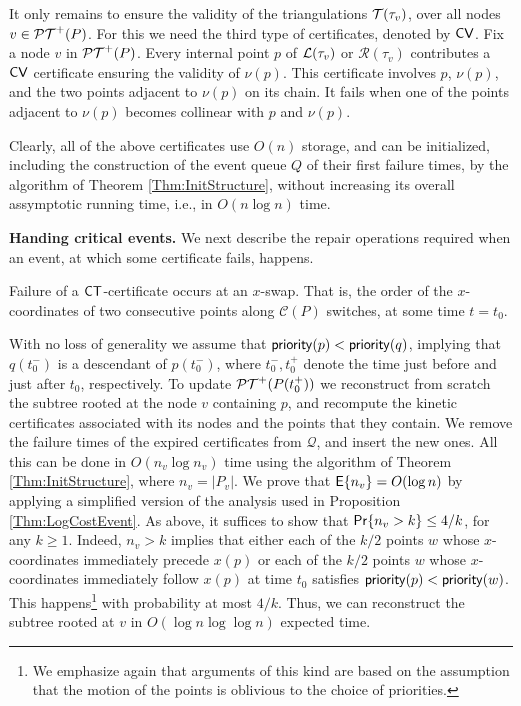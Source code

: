 \documentclass[11pt]{article}
\def \Exp{{\sf E}}
\def\PT{{\cal PT}}
\def\CT{{\sf CT}}
\def\CV{{\sf CV}}
\def\T{{\cal T}}
\def\prior{{\sf priority}}
\def\C{\mathcal{C}}
\def\Q{\mathcal{Q}}
\def\L{{\cal L}}
\def\R{\mathcal{R}}
\def\prob{{\sf Pr}}
\begin{document}
\smallskip
\noindent {\bf \emph{$\CV$-certificates}.}
It only remains to ensure the validity of the triangulations $\T(\tau_v)$, over all nodes
$v\in \PT^+(P)$. For this we need the third type of certificates, denoted by
$\CV$.  Fix a node $v$ in $\PT^+(P)$. Every internal point $p$ of
$\L(\tau_v)$ or $\R(\tau_v)$ contributes a $\CV$ certificate ensuring
the validity of $\nu(p)$. This certificate involves $p$, $\nu(p)$, and 
the two points adjacent to 
 $\nu(p)$ on its chain. It fails when one
of the points adjacent to
$\nu(p)$  becomes collinear with $p$ and $\nu(p)$.

Clearly, all of the above certificates use $O(n)$ storage,
and can be initialized, including the construction of the event queue $Q$ of their first failure times, by the algorithm of Theorem
\ref{Thm:InitStructure}, without increasing its overall assymptotic
running time, i.e., in $O(n\log n)$ time.

\medskip
\noindent
{\bf Handing critical events.} 
We next describe the repair operations 
required when an event, at which some certificate fails, happens. 

\smallskip
\noindent{\bf \emph{$\CT$-certificates.}} Failure of a $\CT$-certificate occurs at an $x$-swap.
That is,
the order of the $x$-coordinates of two consecutive points along $\C(P)$ switches, at some time $t=t_0$.

With no loss of generality we assume that $\prior(p)<\prior(q)$,
implying that $q(t_0^-)$ is a descendant of $p(t_0^-)$, where $t_0^-,t_0^+$ denote the time just before and just after $t_0$, respectively.  To update
 $\PT^+(P(t_0^+))$ we reconstruct  from scratch the subtree rooted at the node $v$ 
containing $p$, and recompute the kinetic
 certificates associated with its nodes and the points that they
contain. We remove the failure times
 of the expired certificates from $\Q$, and insert the new ones.  All
 this can be done in $O(n_v\log n_v)$ time using the algorithm of
 Theorem \ref{Thm:InitStructure}, where $n_v=|P_v|$. We prove that $\Exp \{n_v\}=O(\log n)$ by applying a
 simplified version of the analysis used in Proposition
 \ref{Thm:LogCostEvent}. As above, it suffices to show that
 $\prob\{n_v>k\}\leq 4/k$, for any $k\geq 1$.  Indeed, $n_v>k$ implies
 that either each of the $k/2$ points $w$
whose $x$-coordinates immediately precede $x(p)$ or each of the
$k/2$ points $w$
whose $x$-coordinates immediately follow $x(p)$ at time $t_0$
satisfies  $\prior(p)<\prior(w)$. 
This happens\footnote{\small We emphasize again that arguments of this kind are based on the assumption that the motion of the points is oblivious to the choice of priorities.} with probability at most
 $4/k$. Thus, we can reconstruct the subtree rooted at $v$ in $O(\log
 n\log\log n)$ expected time.
\end{document}
